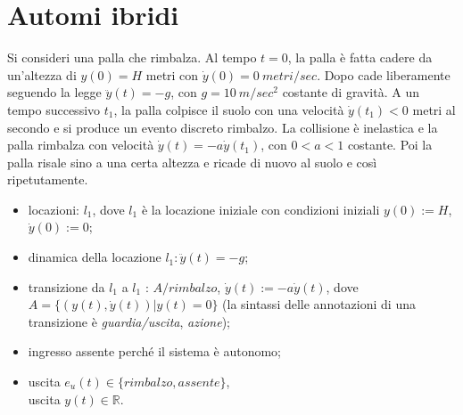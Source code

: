 \documentclass[a4paper, notitlepage, 10pt]{report}
\begin{document}
\chapter*{Automi ibridi}
Si consideri una palla che rimbalza. Al tempo $t = 0$, la palla è fatta cadere da un’altezza di $y(0) = H$ metri con $\dot{y}(0) = 0  ~metri/sec$. Dopo cade liberamente seguendo la legge $\ddot{y}(t) = -g$, con $g = 10 ~m/sec^2$ costante di gravità. A un tempo successivo $t_1$, la palla colpisce il suolo con una velocità $\dot{y}(t_1) < 0$
metri al secondo e si produce un evento discreto rimbalzo. La collisione è inelastica e la palla rimbalza con velocità $\dot{y}(t) = -a\dot{y}(t_1)$, con $0 < a < 1$ costante. Poi la palla risale sino a una certa altezza e ricade di nuovo al suolo e così ripetutamente.
\begin{itemize}
	\item locazioni: {$l_1$}, dove $l_1$ è la locazione iniziale con condizioni iniziali $y(0) := H$, $\dot{y}(0) := 0$;
	\item dinamica della locazione $l_1 : \ddot{y}(t) = -g$;
	\item transizione da $l_1$ a $l_1$ : $A/rimbalzo$, $\dot{y}(t) := -a\dot{y}(t)$, dove $A = \{(y(t), \dot{y}(t)) | y(t) = 0\}$ (la sintassi delle annotazioni di una transizione è \textit{guardia/uscita}, \textit{azione});
	\item ingresso assente perché il sistema è autonomo;
	\item uscita $e_u(t) \in \{rimbalzo, assente\}$,\\
	uscita $y(t) \in \mathbb{R}$.
\end{itemize}
\end{document}
